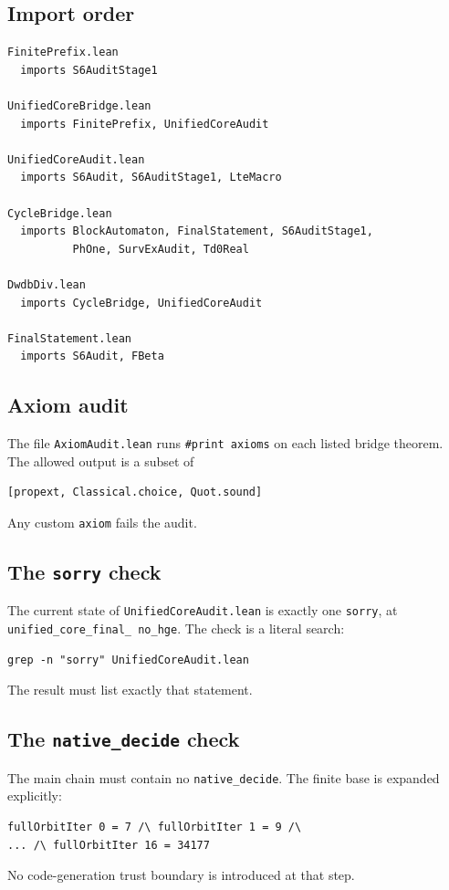 \subsection{Import order}

\begin{verbatim}
FinitePrefix.lean
  imports S6AuditStage1

UnifiedCoreBridge.lean
  imports FinitePrefix, UnifiedCoreAudit

UnifiedCoreAudit.lean
  imports S6Audit, S6AuditStage1, LteMacro

CycleBridge.lean
  imports BlockAutomaton, FinalStatement, S6AuditStage1,
          PhOne, SurvExAudit, Td0Real

DwdbDiv.lean
  imports CycleBridge, UnifiedCoreAudit

FinalStatement.lean
  imports S6Audit, FBeta
\end{verbatim}

\subsection{Axiom audit}

The file \texttt{AxiomAudit.lean} runs \texttt{\#print axioms} on each
listed bridge theorem.  The allowed output is a subset of
\begin{verbatim}
[propext, Classical.choice, Quot.sound]
\end{verbatim}
Any custom \texttt{axiom} fails the audit.

\subsection{The \texttt{sorry} check}

The current state of \texttt{UnifiedCoreAudit.lean} is exactly one
\texttt{sorry}, at
\texttt{unified\_\allowbreak core\_\allowbreak final\_\allowbreak
no\_\allowbreak hge}.  The check is a literal search:
\begin{verbatim}
grep -n "sorry" UnifiedCoreAudit.lean
\end{verbatim}
The result must list exactly that statement.

\subsection{The \texttt{native\_decide} check}

The main chain must contain no \texttt{native\_decide}.  The finite
base is expanded explicitly:
\begin{verbatim}
fullOrbitIter 0 = 7 /\ fullOrbitIter 1 = 9 /\
... /\ fullOrbitIter 16 = 34177
\end{verbatim}
No code-generation trust boundary is introduced at that step.

